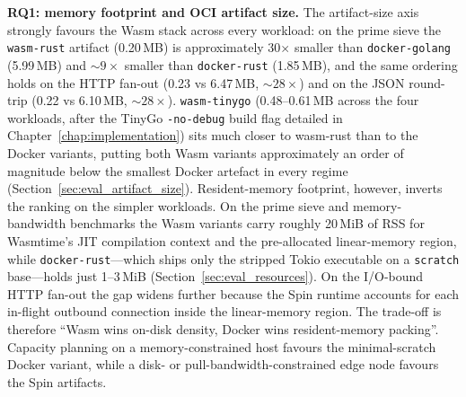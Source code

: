 \begin{sloppypar}
\textbf{RQ1: memory footprint and \acs{OCI} artifact size.} The artifact-size axis strongly favours the \acs{Wasm} stack across every workload: on the prime sieve the \texttt{wasm-rust} artifact (0.20\,MB) is approximately 30$\times$ smaller than \texttt{docker-golang} (5.99\,MB) and ${\sim}9\times$ smaller than \texttt{docker-rust} (1.85\,MB), and the same ordering holds on the HTTP fan-out (0.23 vs 6.47\,MB, ${\sim}28\times$) and on the \acs{JSON} round-trip (0.22 vs 6.10\,MB, ${\sim}28\times$). \texttt{wasm-tinygo} (0.48--0.61\,MB across the four workloads, after the TinyGo \texttt{-no-debug} build flag detailed in Chapter~\ref{chap:implementation}) sits much closer to wasm-rust than to the Docker variants, putting both \acs{Wasm} variants approximately an order of magnitude below the smallest Docker artefact in every regime (Section~\ref{sec:eval_artifact_size}). Resident-memory footprint, however, inverts the ranking on the simpler workloads. On the prime sieve and memory-bandwidth benchmarks the \acs{Wasm} variants carry roughly 20\,MiB of \acs{RSS} for Wasmtime's \acs{JIT} compilation context and the pre-allocated linear-memory region, while \texttt{docker-rust}---which ships only the stripped Tokio executable on a \texttt{scratch} base---holds just 1--3\,MiB (Section~\ref{sec:eval_resources}). On the I/O-bound HTTP fan-out the gap widens further because the Spin runtime accounts for each in-flight outbound connection inside the linear-memory region. The trade-off is therefore ``\acs{Wasm} wins on-disk density, Docker wins resident-memory packing''. Capacity planning on a memory-constrained host favours the minimal-scratch Docker variant, while a disk- or pull-bandwidth-constrained edge node favours the Spin artifacts.
\end{sloppypar}

